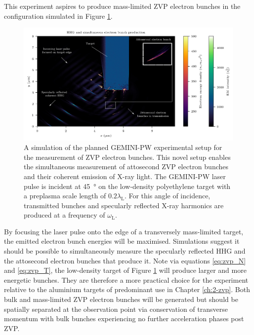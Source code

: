 This experiment aspires to produce mass-limited ZVP electron bunches in the configuration simulated in Figure \ref{fig:experimentsetuphhgbunches2}. %
\begin{figure}
	\centering
	\includegraphics[width=1\linewidth]{figures/zvp/Experiment_setup_HHG_bunches2}
	\caption[Planned GEMINI-PW experimental setup for the measurement of ZVP electron bunches.]{A simulation of the planned GEMINI-PW experimental setup for the measurement of ZVP electron bunches. This novel setup enables the simultaneous measurement of attosecond ZVP electron bunches and their coherent emission of X-ray light. The GEMINI-PW laser pulse is incident at \qty{45}{\degree} on the low-density polyethylene target with a preplasma scale length of $0.2\lambda_\mathrm{L}$. For this angle of incidence, transmitted bunches and specularly reflected X-ray harmonics are produced at a frequency of $\omega_\mathrm{L}$.}
	\label{fig:experimentsetuphhgbunches2}
\end{figure}
By focusing the laser pulse onto the edge of a transversely mass-limited target, the emitted electron bunch energies will be maximised. Simulations suggest it should be possible to simultaneously measure the specularly reflected \ac{HHG} and the attosecond electron bunches that produce it. Note via equations \ref{eq:zvp_N} and \ref{eq:zvp_T}, the low-density target of Figure \ref{fig:experimentsetuphhgbunches2} will produce larger and more energetic bunches. They are therefore a more practical choice for the experiment relative to the aluminium targets of predominant use in Chapter \ref{ch:2-zvp}. Both bulk and mass-limited ZVP electron bunches will be generated but should be spatially separated at the observation point via conservation of transverse momentum with bulk bunches experiencing no further acceleration phases post ZVP.

